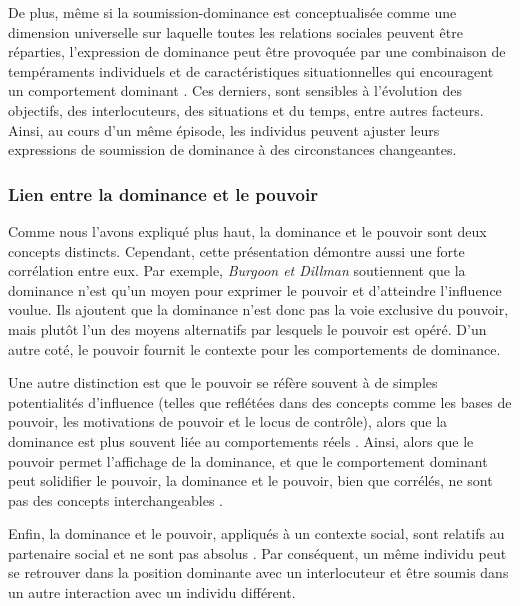 		De plus, même si la soumission-dominance est conceptualisée comme une dimension universelle sur laquelle toutes les relations sociales peuvent être réparties, l'expression de dominance peut être provoquée par une combinaison de tempéraments individuels et de caractéristiques situationnelles	qui encouragent un comportement dominant \cite{burgoon2000interactionist}. Ces derniers, sont sensibles à l'évolution des objectifs, des interlocuteurs, des situations et du temps, entre autres facteurs.
		Ainsi, au cours d'un même épisode, les individus peuvent ajuster leurs expressions de soumission de dominance à des circonstances changeantes.
		
		\subsubsection{Lien entre la dominance et le pouvoir}
		Comme nous l'avons expliqué plus haut, la dominance et le pouvoir sont deux concepts distincts. Cependant, cette présentation démontre aussi une forte corrélation entre eux. 
		Par exemple, \emph{Burgoon et Dillman} \cite{burgoon1995interpersonal} soutiennent que la dominance n'est qu'un moyen pour exprimer le pouvoir et d'atteindre l'influence voulue.
		Ils ajoutent que la dominance n'est donc pas la voie exclusive du pouvoir, mais plutôt l'un des moyens alternatifs par lesquels le pouvoir est opéré. D'un autre coté, le pouvoir fournit le contexte pour les comportements de dominance. %
		
		Une autre distinction est que le pouvoir se réfère souvent à de simples potentialités d'influence (telles que reflétées dans des concepts comme les bases de pouvoir, les motivations de pouvoir et le locus de contrôle),
		alors que la dominance est plus souvent liée au comportements réels \cite{dunbar2005perceptions,burgoon1998nature}. 
		Ainsi, alors que le pouvoir permet l'affichage de la dominance, et que le comportement dominant peut solidifier le pouvoir, la dominance et le pouvoir, bien que corrélés, ne sont pas des concepts interchangeables \cite{burgoon1995interpersonal}.
		
		Enfin, la dominance et le pouvoir, appliqués à un contexte social, sont relatifs au partenaire social et ne sont pas absolus \cite{dunbar2005perceptions}. Par conséquent, un même individu peut se retrouver dans la position dominante avec un interlocuteur et être soumis dans un autre interaction avec un individu différent.
		
